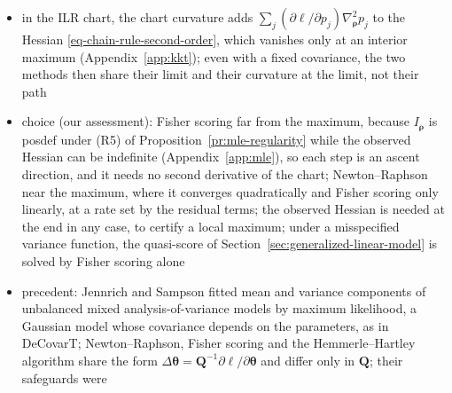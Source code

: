 \begin{itemize}
        dependence of \(\boldsymbol{\Sigma}\) on \(\boldsymbol{p}\), so they vanish when the covariance is fixed: the barycentre freeze
        \eqref{eq-gls-barycentre}, or the single-cell model \eqref{eq:sc-model} with a common within-type covariance
        \(\boldsymbol{\Sigma}_{W,j}=\boldsymbol{\Sigma}_{W}\) and fixed scales \(c\) and \(\phi\), for which \(\boldsymbol{S}_{W}(\boldsymbol{p})=\sum_{j}p_{j}\boldsymbol{\Sigma}_{W}=\boldsymbol{\Sigma}_{W}\) on the simplex; the
        log-likelihood is then quadratic in \(\boldsymbol{p}\), \(\mathbf{H}=-\boldsymbol{\mu}^{\top}\boldsymbol{\Omega}\boldsymbol{\mu}=-I(\boldsymbol{p})\), and both methods reach the
        unconstrained generalised least-squares estimate in one step; in the population-level model a common
        covariance is not enough, since \(\boldsymbol{\Sigma}(\boldsymbol{p})=(\sum_{j}p_{j}^{2})\boldsymbol{\Sigma}\) still depends on \(\boldsymbol{p}\)
  \item in the ILR chart, the chart curvature adds \(\sum_{j}(\partial\ell/\partial p_{j})\nabla^{2}_{\boldsymbol{\rho}}p_{j}\) to the Hessian
        \eqref{eq-chain-rule-second-order}, which vanishes only at an interior maximum (Appendix~\ref{app:kkt}); even with a
        fixed covariance, the two methods then share their limit and their curvature at the limit, not their path
  \item choice (our assessment): Fisher scoring far from the maximum, because \(I_{\boldsymbol{\rho}}\) is \gls{posdef} under
        (R5) of Proposition~\ref{pr:mle-regularity} while the observed Hessian can be indefinite
        (Appendix~\ref{app:mle}), so each step is an ascent direction, and it needs no second derivative of the
        chart; Newton--Raphson near the maximum, where it converges quadratically and Fisher scoring only
        linearly, at a rate set by the residual terms; the observed Hessian is needed at the end in any case, to
        certify a local maximum; under a misspecified variance function, the quasi-score of
        Section~\ref{sec:generalized-linear-model} is solved by Fisher scoring alone
  \item precedent: Jennrich and Sampson \cite{jennrichNewtonRaphsonRelatedAlgorithms1976} fitted mean and variance components of
        unbalanced mixed analysis-of-variance models by maximum likelihood, a Gaussian model whose covariance depends on the
        parameters, as in DeCovarT; Newton--Raphson, Fisher scoring and the Hemmerle--Hartley algorithm share the form
        \(\Delta\boldsymbol{\theta}=\boldsymbol{Q}^{-1}\partial\ell/\partial\boldsymbol{\theta}\) and differ only in \(\boldsymbol{Q}\); their safeguards were

\end{itemize}
